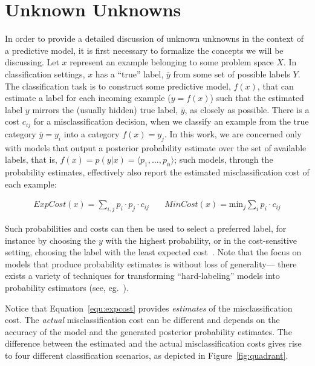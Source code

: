 \section{Unknown Unknowns}
\label{sec:unknowns}

In order to provide a detailed discussion of unknown unknowns in the context of a predictive model, it is first necessary to formalize the concepts we will be discussing. Let $x$ represent an example belonging to some problem space $X$. In classification settings, $x$ has a ``true'' label, $\bar{y}$ from some set of possible labels $Y$. The classification task is to construct some predictive model, $f(x)$, that can estimate a label for each incoming example ($y = f(x)$) such that the estimated label $y$ mirrors the (usually hidden) true label, $\bar{y}$, as closely as possible. There is a cost $c_{ij}$ for a misclassification decision, when we classify an example from the true category $\bar{y}=y_i$ into a category $f(x)=y_j$. In this work, we are concerned only with models that output a posterior probability estimate over the set of available labels, that is, $f(x) = p(y | x) = \langle p_1, \ldots, p_n \rangle$; such models, through the probability estimates, effectively also  report the estimated misclassification cost of each example:

\begin{eqnarray}
\mathit{ExpCost}(x) =  \sum_{i,j} p_i \cdot p_j \cdot c_{ij} & ~ & \mathit{MinCost}(x) =  \mbox{min}_j \sum_{i} p_i \cdot c_{ij} \label{equ:expcost} 
 \label{equ:mincost}
\end{eqnarray}

Such probabilities and costs can then be used to select a preferred label, for instance by choosing the $y$ with the highest probability, or in the cost-sensitive setting, choosing the label with the least expected cost~\cite{elkan:2001cost}. Note that the focus on models that produce probability estimates is without loss of generality--- there exists a variety of techniques for transforming ``hard-labeling'' models into probability estimators (see, eg.~\cite{domingos1999metacost}).

Notice that Equation~\ref{equ:expcost} provides \emph{estimates} of the misclassification cost. The \emph{actual} misclassification cost can be different and depends on the accuracy of the model and the generated posterior probability estimates. The difference between the estimated and the 
actual misclassification costs gives rise to four different classification scenarios, as depicted in Figure~\ref{fig:quadrant}.

